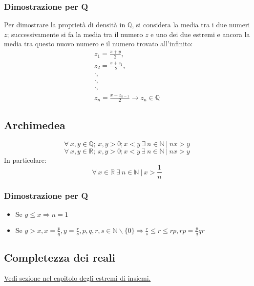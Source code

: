 \subsubsection*{Dimostrazione per Q}
Per dimostrare la propriet\`a di densit\`a in $\mathbb{Q}$, si considera la media tra i due numeri $z$; successivamente si fa la media tra il numero $z$ e uno dei due estremi
e ancora la media tra questo nuovo numero e il numero trovato all'infinito:
\begin{gather*}
z_1=\frac{x+y}{2},\\
z_2=\frac{x+z_1}{2},\\
\cdot,\\
\cdot,\\
\cdot,\\
z_n=\frac{x+z_{n-1}}{2}\rightarrow z_n\in\mathbb{Q}
\end{gather*}

\subsection{Archimedea}
\begin{equation*}
\forall\ x,y \in \mathbb{Q};\ x,y > 0; x<y\ \exists\ n \in \mathbb{N}\ |\ nx>y
\end{equation*}
\begin{equation*}
\forall\ x,y \in \mathbb{R};\ x,y > 0; x<y\ \exists\ n \in \mathbb{N}\ |\ nx>y
\end{equation*}
In particolare:
\begin{equation*}
\forall\ x \in \mathbb{R}\ \exists\ n \in \mathbb{N}\ |\ x>\frac{1}{n}
\end{equation*}
\subsubsection*{Dimostrazione per Q}
\begin{itemize}
\item Se $y\le x\Rightarrow n=1$
\item Se $y>x, x=\frac{p}{q}, y=\frac{r}{s}, p,q,r,s\in\mathbb{N}\backslash\{0\}\Rightarrow \frac{r}{s}\le r\le rp, rp=\frac{p}{q}qr$
\end{itemize}

\subsection{Completezza dei reali}
\hyperref[sec: CompletezzaReali]{\color{cyan}Vedi sezione nel capitolo degli estremi di insiemi.}